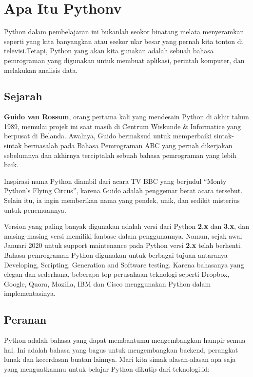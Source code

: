 \documentclass[
]{docs}
\begin{document}
\hypertarget{apa-itu-pythonv}{%
\section*{Apa Itu Pythonv}\label{apa-itu-pythonv}}

Python dalam pembelajaran ini bukanlah seokor binatang melata menyeramkan seperti yang kita banyangkan atau seekor ular besar yang pernah kita tonton di televisi.Tetapi, Python yang akan kita gunakan adalah sebuah bahasa pemrograman yang digunakan untuk membuat aplikasi, perintah komputer, dan melakukan analisis data.

\hypertarget{sejarah}{%
\subsection{Sejarah}\label{sejarah}}

\textbf{Guido van Rossum}, orang pertama kali yang mendesain Python di akhir tahun 1989, memulai projek ini saat masih di Centrum Wiskunde \& Informatice yang berpusat di Belanda. Awalnya, Guido bermaksud untuk memperbaiki sintak-sintak bermasalah pada Bahasa Pemrograman ABC yang pernah dikerjakan sebelumnya dan akhirnya terciptalah sebuah bahasa pemrograman yang lebih baik.

Inspirasi nama Python diambil dari acara TV BBC yang berjudul ``Monty Python's Flying Circus'', karena Guido adalah penggemar berat acara tersebut. Selain itu, ia ingin memberikan nama yang pendek, unik, dan sedikit misterius untuk penemuannya.

Version yang paling banyak digunakan adalah versi dari Python \textbf{2.x} dan \textbf{3.x}, dan masing-masing versi memiliki fanbase dalam penggunannya. Namun, sejak awal Januari 2020 untuk support maintenance pada Python versi \textbf{2.x} telah berhenti. Bahasa pemrograman Python digunakan untuk berbagai tujuan antaranya Developing, Scripting, Generation and Software testing. Karena bahasanya yang elegan dan sederhana, beberapa top perusahaan teknologi seperti Dropbox, Google, Quora, Mozilla, IBM dan Cisco menggunakan Python dalam implementasinya.

\hypertarget{peranan}{%
\subsection{Peranan}\label{peranan}}

Python adalah bahasa yang dapat membantumu mengembangkan hampir semua hal. Ini adalah bahasa yang bagus untuk mengembangkan backend, perangkat lunak dan kecerdasan buatan lainnya. Mari kita simak alasan-alasan apa saja yang menguatkanmu untuk belajar Python dikutip dari teknologi.id:
\end{document}
